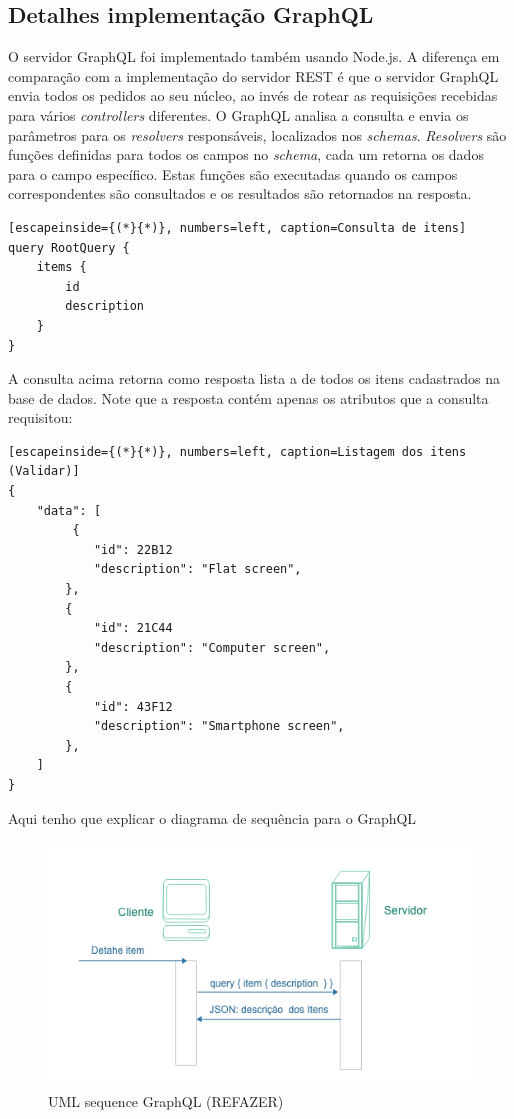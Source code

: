 \subsection{Detalhes implementação GraphQL}

O servidor GraphQL foi implementado também usando Node.js. A diferença em comparação com a implementação do servidor REST é que o servidor GraphQL envia todos os pedidos ao seu núcleo, ao invés de rotear as requisições recebidas para vários \textit{controllers} diferentes. O GraphQL analisa a consulta e envia os parâmetros para os \textit{resolvers} responsáveis, localizados nos \textit{schemas}. \textit{Resolvers} são funções definidas para todos os campos no \textit{schema}, cada um retorna os dados para o campo específico. Estas funções são executadas quando os campos correspondentes são consultados e os resultados são retornados na resposta.

\begin{lstlisting}[escapeinside={(*}{*)}, numbers=left, caption=Consulta de itens]
query RootQuery {
	items {
    	id
    	description
    }
}

\end{lstlisting}

 A consulta acima retorna como resposta lista a de todos os itens cadastrados na base de dados. Note que a resposta contém apenas os atributos que a consulta requisitou:

\begin{lstlisting}[escapeinside={(*}{*)}, numbers=left, caption=Listagem dos itens (Validar)]
{
    "data": [
         {
        	"id": 22B12
            "description": "Flat screen",
        },
        {
        	"id": 21C44
            "description": "Computer screen",
        },
        {
        	"id": 43F12
            "description": "Smartphone screen",
        },
    ]
}

\end{lstlisting}

Aqui tenho que explicar o diagrama de sequência para o GraphQL

\begin{figure}[htbp]
\centering
\includegraphics[width=1\textwidth]{figuras/uml-graph.png}
\caption{UML sequence GraphQL (REFAZER)}
\label{fig:graph-uml}
\author{fonte: Autor}
\end{figure}

